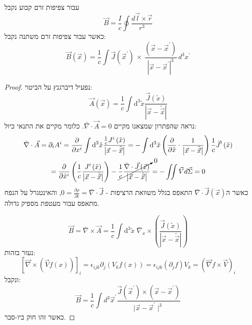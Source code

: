 \documentclass{tstextbook}
\begin{document}
\begin{theorem}
עבור צפיפות זרם קבוע נקבל
$$\vec{B} = \frac{I}{c}\oint \frac{d\vec{l} \times \vec{r}}{r^3}$$
כאשר עבור צפיפות זרם משתנה נקבל:
$$\vec{B}\left( \vec{x} \right)={\frac{1}{c}}\int\!\vec{J}\left( \vec{x}^{\prime} \right)\,\times\,{\frac{\left( \vec{x}-\vec{x}^{\prime} \right)}{|\vec{x}-\vec{x}^{\prime}|^{3}}}\,d^{3}x^{\prime}$$

\end{theorem}
\begin{proof}
נפעיל דיברגנץ על הביטוי:
$$\vec{A}\left( \vec{x} \right)=\frac{1}{c}\int\mathrm{d}^3\tilde{x}  \frac{\vec{J}\left( \tilde{x} \right)}{\left\lvert  \vec{x}-\tilde{\vec{x}}  \right\rvert }$$
נראה שהפתרון שמצאנו מקיים \(\bar{\nabla} \cdot \vec{A}=0\). כלומר מקיים את התנאי כיול:
$$\begin{gather}\bar{\nabla} \cdot \vec{A} = \partial_{i}A^i = \frac{\partial }{\partial x^i} \int\mathrm{d^3}\tilde{x} \frac{\frac{1}{c}J^i\left( \tilde{x} \right)}{\left\lvert  \vec{x}  -\tilde{\vec{x}}\right\rvert }=-\int\mathrm{d^3}\tilde{x} \left( \frac{\partial }{\partial \tilde{x}} \cdot \frac{1}{\left\lvert  \vec{x}-\tilde{\vec{x}}  \right\rvert } \right) \frac{1}{c} \vec{J}'\left( \tilde{x} \right)  \\=\frac{\partial }{\partial \tilde{x}^{i}} \left( \frac{1}{c} \frac{J'\left( \tilde{x} \right)}{\left\lvert  \vec{x}-\tilde{\vec{x}}  \right\rvert } \right)-\cancelto{ 0 }{ \frac{1}{c} \frac{\bar{\nabla} \cdot \vec{J}\left( \vec{x} \right)}{\left\lvert  \vec{x}-\tilde{\vec{x}}  \right\rvert } } = -\iint\vec{V} d\vec{\Sigma}=0
\end{gather}$$
כאשר ה\(\bar{\nabla} \cdot \vec{J}\left( \vec{x} \right)\) התאפס בגלל משוואת הרציפות - \(0 = \frac{\partial \rho}{\partial t}=\bar{\nabla} \cdot \vec{J}\), והאינטגרל על הנפח מתאפס עבור מעטפת מספיק גדולה.

$$\vec{B} = \bar{\nabla} \times \vec{A} = \frac{1}{c}\int\mathrm{d^3}\tilde{x} \;\bar{\nabla}_{x} \times \left( \frac{\vec{J}\left( \tilde{x} \right)}{\left\lvert  \vec{x}-\tilde{\vec{x}}  \right\rvert } \right)$$
נעזר בזהות:
$$\left[\vec{\nabla}\times\left(\vec{V}f\left(x\right)\right)\right]_{i}=\epsilon_{i j k}\partial_{j}\left(V_{k}f\left(x\right)\right)=\epsilon_{i j k}\left(\partial_{j}f\right)V_{k}=\left(\vec{\nabla}f\times\vec{V}\right)_{i}$$
ונקבל:
$$\vec{B}=\frac{1}{c}\int d^{3}\vec{x}^{\prime}\frac{\vec{J}\left(\vec{x}^{\prime}\right)\times\left(\vec{x}-\vec{x}^{\prime}\right)}{\mid\vec{x}-\vec{x}^{\prime}\mid^{3}}$$
כאשר זהו חוק ביו-סבר.

\end{proof}
\end{document}
